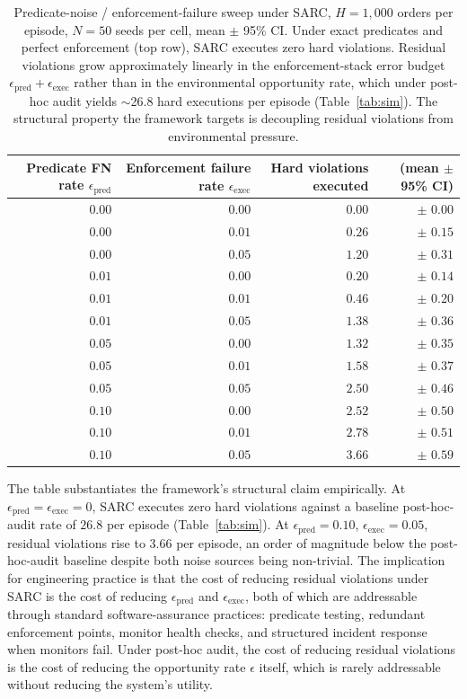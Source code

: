 \documentclass[11pt,a4paper]{article}
\theoremstyle{remark}
\begin{document}
\begin{table}[!htbp]
\centering\footnotesize
\begin{tabular}{@{}rrrr@{}}
\toprule
\textbf{Predicate FN rate $\epsilon_{\text{pred}}$} & \textbf{Enforcement failure rate $\epsilon_{\text{exec}}$} & \textbf{Hard violations executed} & \textbf{(mean $\pm$ 95\% CI)} \\
\midrule
$0.00$ & $0.00$ & $0.00$  & $\pm$ $0.00$ \\
$0.00$ & $0.01$ & $0.26$  & $\pm$ $0.15$ \\
$0.00$ & $0.05$ & $1.20$  & $\pm$ $0.31$ \\
$0.01$ & $0.00$ & $0.20$  & $\pm$ $0.14$ \\
$0.01$ & $0.01$ & $0.46$  & $\pm$ $0.20$ \\
$0.01$ & $0.05$ & $1.38$  & $\pm$ $0.36$ \\
$0.05$ & $0.00$ & $1.32$  & $\pm$ $0.35$ \\
$0.05$ & $0.01$ & $1.58$  & $\pm$ $0.37$ \\
$0.05$ & $0.05$ & $2.50$  & $\pm$ $0.46$ \\
$0.10$ & $0.00$ & $2.52$  & $\pm$ $0.50$ \\
$0.10$ & $0.01$ & $2.78$  & $\pm$ $0.51$ \\
$0.10$ & $0.05$ & $3.66$  & $\pm$ $0.59$ \\
\bottomrule
\end{tabular}
\caption{Predicate-noise / enforcement-failure sweep under SARC, $H = 1{,}000$ orders per episode, $N = 50$ seeds per cell, mean $\pm$ 95\% CI. Under exact predicates and perfect enforcement (top row), SARC executes zero hard violations. Residual violations grow approximately linearly in the enforcement-stack error budget $\epsilon_{\text{pred}} + \epsilon_{\text{exec}}$ rather than in the environmental opportunity rate, which under post-hoc audit yields $\sim$26.8 hard executions per episode (Table~\ref{tab:sim}). The structural property the framework targets is decoupling residual violations from environmental pressure.}
\label{tab:residual}
\end{table}

The table substantiates the framework's structural claim empirically. At $\epsilon_{\text{pred}} = \epsilon_{\text{exec}} = 0$, SARC executes zero hard violations against a baseline post-hoc-audit rate of $26.8$ per episode (Table~\ref{tab:sim}). At $\epsilon_{\text{pred}} = 0.10$, $\epsilon_{\text{exec}} = 0.05$, residual violations rise to $3.66$ per episode, an order of magnitude below the post-hoc-audit baseline despite both noise sources being non-trivial. The implication for engineering practice is that the cost of reducing residual violations under SARC is the cost of reducing $\epsilon_{\text{pred}}$ and $\epsilon_{\text{exec}}$, both of which are addressable through standard software-assurance practices: predicate testing, redundant enforcement points, monitor health checks, and structured incident response when monitors fail. Under post-hoc audit, the cost of reducing residual violations is the cost of reducing the opportunity rate $\epsilon$ itself, which is rarely addressable without reducing the system's utility.
\end{document}
